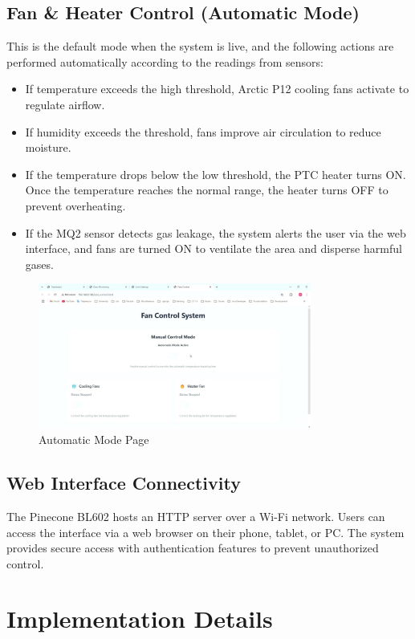 \documentclass[a4paper]{scrartcl}
\begin{document}
\subsection{Fan \& Heater Control (Automatic Mode)}
This is the default mode when the system is live, and the following actions are performed automatically according to the readings from sensors:
\begin{itemize}
    \item If temperature exceeds the high threshold, Arctic P12 cooling fans activate to regulate airflow.
    \item If humidity exceeds the threshold, fans improve air circulation to reduce moisture.
    \item If the temperature drops below the low threshold, the PTC heater turns ON. Once the temperature reaches the normal range, the heater turns OFF to prevent overheating.
    \item If the MQ2 sensor detects gas leakage, the system alerts the user via the web interface, and fans are turned ON to ventilate the area and disperse harmful gases.
\end{itemize}
\begin{figure}[H]
    \centering
    \includegraphics[width=0.8\textwidth]{images/AM.jpg}
    \caption{Automatic Mode Page}
\end{figure}


\subsection{Web Interface Connectivity}
The Pinecone BL602 hosts an HTTP server over a Wi-Fi network. Users can access the interface via a web browser on their phone, tablet, or PC. The system provides secure access with authentication features to prevent unauthorized control.

\section{Implementation Details}
\end{document}
